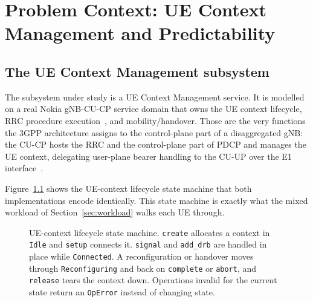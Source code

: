 \documentclass[english,twoside,openright,a4paper,censored,csm,software-track-2020]{HYthesisML}
\begin{document}
\chapter{Problem Context: UE Context Management and Predictability\label{chapter:context}}

\section{The UE Context Management subsystem}
The subsystem under study is a UE Context Management service. It is modelled on a real Nokia
gNB-CU-CP service domain that owns the UE context lifecycle, RRC procedure
execution~\cite{3gpp38331}, and mobility/handover. Those are the very functions the 3GPP
architecture assigns to the control-plane part of a disaggregated gNB: the CU-CP hosts the RRC
and the control-plane part of PDCP and manages the UE context, delegating user-plane bearer
handling to the CU-UP over the E1 interface~\cite{3gpp38401,3gpp38300,3gpp38463}.

Figure~\ref{fig:fsm} shows the UE-context lifecycle state machine that both implementations
encode identically. This state machine is exactly what the mixed workload
of Section~\ref{sec:workload} walks each UE through.

\begin{figure}[ht]
\centering
{}
\caption[UE-context lifecycle state machine]{UE-context lifecycle state machine. \texttt{create} allocates a context in
\texttt{Idle} and \texttt{setup} connects it. \texttt{signal} and \texttt{add\_drb} are handled
in place while \texttt{Connected}. A reconfiguration or handover moves through
\texttt{Reconfiguring} and back on \texttt{complete} or \texttt{abort}, and \texttt{release}
tears the context down. Operations invalid for the current state return an \texttt{OpError}
instead of changing state.\label{fig:fsm}}
\end{figure}
\end{document}
